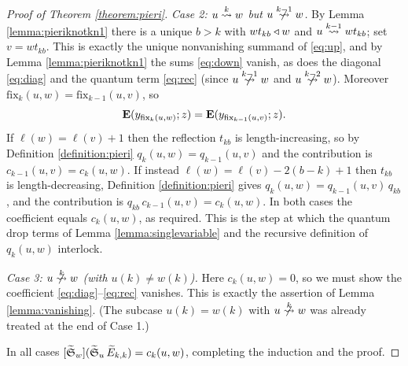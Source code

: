 \documentclass{amsart}
\theoremstyle{definition}
\theoremstyle{remark}
\numberwithin{equation}{section}
\DeclareMathOperator{\qsch}{\widetilde{\mathfrak{S}}}
\newcommand{\xrightsquigarrow}[2][]{%
	\mathrel{\mathop{\rightsquigarrow}\limits^{\scriptstyle #2}%
	\ifx\hfuzz#1\hfuzz\else_{\scriptstyle #1}\fi}%
}
\newcommand{\tom}[1]{\ensuremath{\xrightsquigarrow{#1}}}
\newcommand{\fx}{\mathrm{fix}}
\begin{document}
\begin{proof}[Proof of Theorem \ref{theorem:pieri}]
\emph{Case 2: $u\tom{k}w$ but $u\ntom{k-1}w$.} By Lemma \ref{lemma:pieriknotkn1} there is a unique $b>k$ with $wt_{kb}\triangleleft w$ and $u\tom{k-1}wt_{kb}$; set $v=wt_{kb}$. This is exactly the unique nonvanishing summand of \eqref{eq:up}, and by Lemma \ref{lemma:pieriknotkn1} the sums \eqref{eq:down} vanish, as does the diagonal \eqref{eq:diag} and the quantum term \eqref{eq:rec} (since $u\ntom{k-1}w$ and $u\ntom{k-2}w$). Moreover $\fx_{k}(u,w)=\fx_{{k-1}}(u,v)$, so
$$\wte(y_{\fx_{k}(u,w)};z)=\wte(y_{\fx_{{k-1}}(u,v)};z).$$
If $\ell(w)=\ell(v)+1$ then the reflection $t_{kb}$ is length-increasing, so by Definition \ref{definition:pieri} $q_k(u,w)=q_{k-1}(u,v)$ and the contribution is $c_{k-1}(u,v)=c_k(u,w)$. If instead $\ell(w)=\ell(v)-2(b-k)+1$ then $t_{kb}$ is length-decreasing, Definition \ref{definition:pieri} gives $q_k(u,w)=q_{k-1}(u,v)\,q_{kb}$, and the contribution is $q_{kb}\,c_{k-1}(u,v)=c_k(u,w)$. In both cases the coefficient equals $c_k(u,w)$, as required. This is the step at which the quantum drop terms of Lemma \ref{lemma:singlevariable} and the recursive definition of $q_k(u,w)$ interlock.

\emph{Case 3: $u\ntom{k}w$ (with $u(k)\neq w(k)$).} Here $c_k(u,w)=0$, so we must show the coefficient \eqref{eq:diag}--\eqref{eq:rec} vanishes. This is exactly the assertion of Lemma \ref{lemma:vanishing}. (The subcase $u(k)=w(k)$ with $u\ntom{k}w$ was already treated at the end of Case 1.)

In all cases $[\qsch_w](\qsch_u\qelem_{k,k})=c_k(u,w)$, completing the induction and the proof.
\end{proof}
\end{document}
